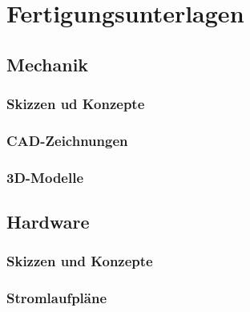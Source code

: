 \documentclass[titlepage,12pt,twoside]{article}
\begin{document}
\section{Fertigungsunterlagen}
\label{chap:Fertigungsunterlagen}
\subsection{Mechanik}
\label{chap:Fertigungsunterlagen_Mechanik}
\subsubsection{Skizzen ud Konzepte}

\subsubsection{CAD-Zeichnungen}

\subsubsection{3D-Modelle}

\newpage
\subsection{Hardware}
\label{chap:Fertigungsunterlagen_Hardware}
\subsubsection{Skizzen und Konzepte}

\newpage
\subsubsection{Stromlaufpläne}








\end{document}
